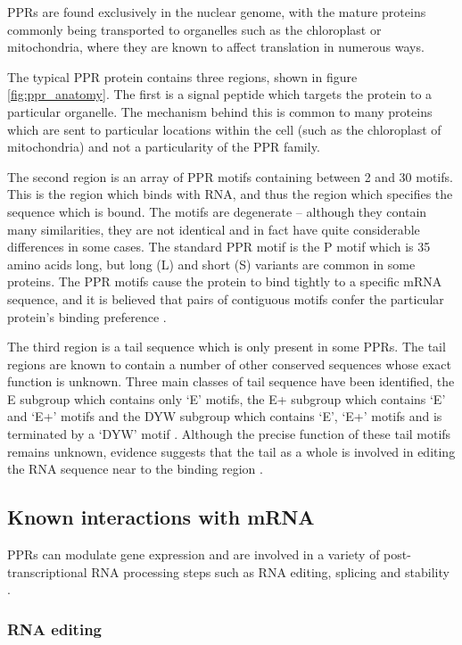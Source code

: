 PPRs are found exclusively in the nuclear genome, with the mature proteins
commonly being transported to
organelles such as the chloroplast or mitochondria, where they are known to
affect translation in numerous ways.

The typical PPR protein contains three regions, shown in figure
\ref{fig:ppr_anatomy}.
The first is a signal peptide which targets the protein to a particular 
organelle.
The mechanism behind this is common to many proteins which are sent to 
particular
locations within the cell (such as the chloroplast of mitochondria) and not a
particularity of the PPR family. 

The second region is an array of PPR motifs containing between 2 and
30 motifs.
This is the region which binds with RNA, and thus the region which specifies
the sequence which is bound.
The motifs are degenerate -- although they contain many similarities, they are
not identical and in fact have quite considerable differences in some cases.
The standard PPR motif is the P motif which is 35 amino acids long, 
but long (L) and short (S) variants are common in some proteins.
The PPR motifs cause the protein to bind tightly to a specific mRNA sequence,
and it is believed that pairs of contiguous motifs confer the particular
protein's binding preference \citep{Kobayashi2012}.

The third region is a tail sequence which is only present in some PPRs.
The tail regions are known to contain a number of other conserved sequences 
whose exact function is unknown.
Three main classes of tail sequence have been identified, 
the E subgroup which contains
only `E' motifs, the E+ subgroup which contains `E' and `E+' motifs and the DYW
subgroup which contains `E', `E+' motifs and is terminated by a `DYW' motif
\citep{Lurin2004}.
Although the precise function of these tail motifs remains unknown, 
evidence suggests that the tail as a whole is involved in editing the RNA
sequence near to the binding region \citep{Yagi2013a}.

\subsection{Known interactions with mRNA}

PPRs can modulate gene expression and are involved in a variety of
post-transcriptional RNA processing steps such as RNA editing, splicing and
stability \citep{Schmitz-Linneweber2008,Nakamura2012}.

\subsubsection{RNA editing}

